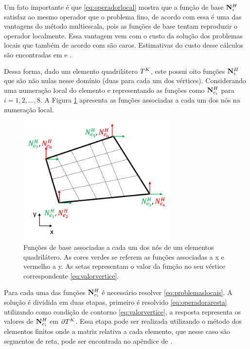 Um fato importante é que \eqref{eq:operadorlocal} mostra que a função de base $\mathbf{N}_{i}^H$ satisfaz ao mesmo operador que o problema fino, de acordo com \citet{thomashou} essa é uma das vantagens do método multiescala, pois as funções de base tentam reproduzir o operador localmente. Essa vantagem vem com o custo da solução dos problemas locais que também de acordo com \citet{thomashou} são caros. Estimativas do custo desse cálculos são encontradas em \citet{msparalelo} e \citet{mbuck}.

Dessa forma, dado um elemento quadrilátero $T^K$, este possui oito funções $\mathbf{N}_{i}^H$ que são não nulas nesse domínio (duas para cada um dos vértices). Considerando uma numeração local do elemento e representando as funções como ${\mathbf{N}_{e_{i}}^H}$ para $i=1,2,\dots, 8$. A Figura \ref{fig:coarsefunctionslocalnum} apresenta as funções associadas a cada um dos nós na numeração local.


\begin{figure}[!htbp]
\centering
\includegraphics[width=8cm]{chap06/figs/funcoesDeBaseGrossasColorido.png}
\caption{Funções de base associadas a cada um dos nós de um elementos quadrilátero. As cores verdes se referem as funções associadas a x e vermelho a y. As setas representam o valor da função no seu vértice correspondente \eqref{eq:valorvertice}.}
\label{fig:coarsefunctionslocalnum}
\end{figure}

Para cada uma das funções ${\mathbf{N}_{e_{i}}^H}$ é necessário resolver \eqref{eq:problemaslocais}. A solução é dividida em duas etapas, primeiro é resolvido \eqref{eq:operadoraresta} utilizando como condição de contorno \eqref{eq:valorvertice}, a resposta representa os valores de ${\mathbf{N}_{e_{i}}^H}$ em $\partial T^K$. Essa etapa pode ser realizada utilizando o  método dos elementos finitos onde a matriz relativa a cada elemento, que nesse caso são segmentos de reta, pode ser encontrada no apêndice de \cite{casteletto}. 


